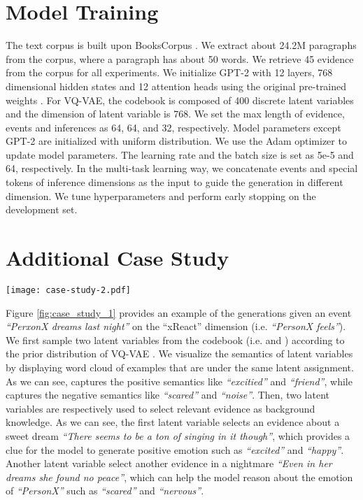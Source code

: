 \documentclass[11pt,a4paper]{article}
\begin{document}
\section{Model Training}
The text corpus is built upon BooksCorpus \cite{zhu2015aligning}. We extract about 24.2M paragraphs from the corpus, where a paragraph has about 50 words. We retrieve 45 evidence from the corpus for all experiments. We initialize GPT-2 with 12 layers, 768 dimensional hidden states and 12 attention heads using the original pre-trained weights \cite{radford2019language}. For VQ-VAE, the codebook is composed of 400 discrete latent variables and the dimension of latent variable is 768. We set the max length of evidence, events and inferences as 64, 64, and 32, respectively.
Model parameters except GPT-2 are initialized with uniform distribution. We use the Adam optimizer to update model parameters. The learning rate and the batch size is set as 5e-5 and 64, respectively.  In the multi-task learning way, we concatenate events and special tokens of inference dimensions as the input to guide the generation in different dimension. We tune hyperparameters and perform early stopping on the development set.

\section{Additional Case Study}
\begin{figure*}[t]
	\centering
	\texttt{[image: case-study-2.pdf]}
	\caption{An examples of Event2Mind dataset on the xReact dimension (i.e. \textit{``PersonX feels''}).}
	\label{fig:case_study_1}
\end{figure*}
Figure \ref{fig:case_study_1} provides an example of the generations given an event \textit{``PerxonX dreams last night''} on the ``xReact'' dimension (i.e. \textit{``PersonX feels''}). We first sample two latent variables from the codebook (i.e.  and ) according to the prior distribution of VQ-VAE \cite{van2017neural}. We visualize the semantics of latent variables by displaying word cloud of examples that are under the same latent assignment. As we can see,  captures the positive semantics like \textit{``excitied''} and \textit{``friend''}, while  captures the negative semantics like \textit{``scared''} and \textit{``noise''}. Then, two latent variables are respectively used to select relevant evidence as background knowledge. As we can see, the first latent variable selects an evidence about a sweet dream \textit{``There seems to be a ton of singing in it though''}, which provides a clue for the model to generate positive emotion such as \textit{``excited''} and \textit{``happy''}. Another latent variable select another evidence in a nightmare \textit{``Even in her dreams she found no peace''}, which can help the model reason about the emotion of \textit{``PersonX''} such as \textit{``scared''} and \textit{``nervous''}. 
\end{document}
